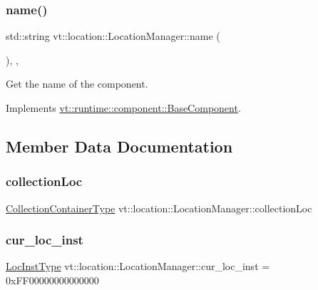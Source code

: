\subsubsection{\texorpdfstring{name()}{name()}}
{\footnotesize\ttfamily std\+::string vt\+::location\+::\+Location\+Manager\+::name (\begin{DoxyParamCaption}{ }\end{DoxyParamCaption})\hspace{0.3cm}{\ttfamily [inline]}, {\ttfamily [override]}, {\ttfamily [virtual]}}



Get the name of the component. 



Implements \hyperlink{structvt_1_1runtime_1_1component_1_1_base_component_a7701485f3539f78d42e6bad47fc7eb78}{vt\+::runtime\+::component\+::\+Base\+Component}.



\subsection{Member Data Documentation}
\mbox{\label{structvt_1_1location_1_1_location_manager_a748aa3659f6aee39fb0936e694aa74ac}} 
\subsubsection{\texorpdfstring{collection\+Loc}{collectionLoc}}
{\footnotesize\ttfamily \hyperlink{structvt_1_1location_1_1_location_manager_a03472723aecf57cd99cd221ef2164edb}{Collection\+Container\+Type} vt\+::location\+::\+Location\+Manager\+::collection\+Loc\hspace{0.3cm}{\ttfamily [protected]}}

\mbox{\label{structvt_1_1location_1_1_location_manager_a644b4b030fd616375728316281295250}} 
\subsubsection{\texorpdfstring{cur\+\_\+loc\+\_\+inst}{cur\_loc\_inst}}
{\footnotesize\ttfamily \hyperlink{namespacevt_1_1location_a4db6456e8024af2d23fc5ae560fef866}{Loc\+Inst\+Type} vt\+::location\+::\+Location\+Manager\+::cur\+\_\+loc\+\_\+inst = 0x\+F\+F00000000000000\hspace{0.3cm}{\ttfamily [static]}}



